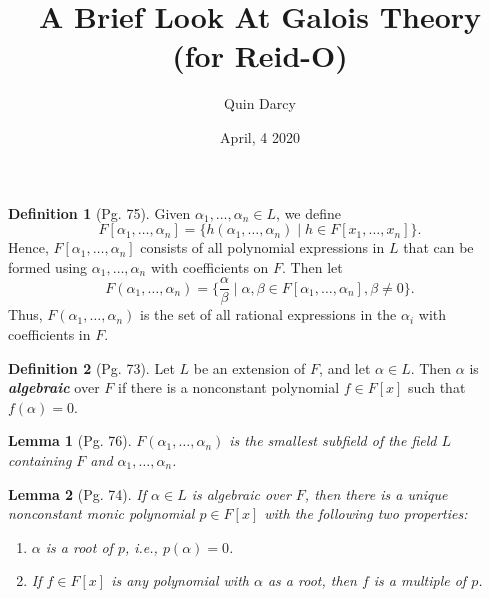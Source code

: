 \documentclass[leqno]{article}
\newtheorem{lemma}{Lemma}
\theoremstyle{definition}
\newtheorem{definition}{Definition}
\theoremstyle{remark}
\theoremstyle{definition}
\begin{document}
\title{A Brief Look At Galois Theory (for Reid-O)}
\author{Quin Darcy}
\date{April, 4 2020}
\maketitle

    \begin{definition}[Pg. 75]\label{def:1}
        Given $\alpha_1,\dots,\alpha_n\in L$, we define
            \begin{equation*}
                F[\alpha_1,\dots,\alpha_n]=\{h(\alpha_1,\dots,\alpha_n)\mid h\in F[x_1,\dots,x_n]\}.
            \end{equation*}
        Hence, $F[\alpha_1,\dots,\alpha_n]$ consists of all polynomial expressions in $L$ that can be formed using $\alpha_1,\dots,\alpha_n$ with coefficients on $F$. Then let 
            \begin{equation*}
                F(\alpha_1,\dots,\alpha_n)=\bigg\{\frac{\alpha}{\beta}\mid \alpha,\beta\in F[\alpha_1,\dots,\alpha_n],\beta\neq 0\bigg\}.
            \end{equation*}
        Thus, $F(\alpha_1,\dots,\alpha_n)$ is the set of all rational expressions in the $\alpha_i$ with coefficients in $F$.
    \end{definition}
    \begin{definition}[Pg. 73]\label{def:2}
        Let $L$ be an extension of $F$, and let $\alpha\in L$. Then $\alpha$ is \textbf{\textit{algebraic}} over $F$ if there is a nonconstant polynomial $f\in F[x]$ such that $f(\alpha)=0$.
    \end{definition}
    \begin{lemma}[Pg. 76]\label{lem:1}
        $F(\alpha_1,\dots,\alpha_n)$ is the smallest subfield of the field $L$ containing $F$ and $\alpha_1,\dots,\alpha_n$.
    \end{lemma}
    \begin{lemma}[Pg. 74]\label{lem:2}
        If $\alpha\in L$ is algebraic over $F$, then there is a unique nonconstant monic polynomial $p\in F[x]$ with the following two properties:
            \begin{enumerate}[label=\normalfont{(\alph*)}]
                \item $\alpha$ is a root of $p$, i.e., $p(\alpha)=0$.
                \item If $f\in F[x]$ is any polynomial with $\alpha$ as a root, then $f$ is a multiple of $p$.
            \end{enumerate}
    \end{lemma}
\end{document}
